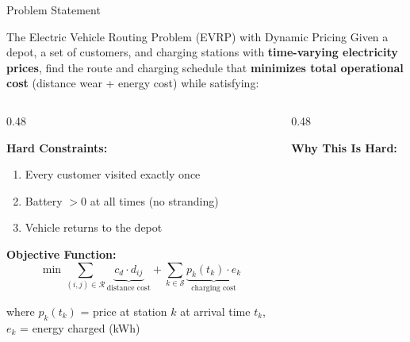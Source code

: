 \documentclass[aspectratio=169, 11pt]{beamer}
\begin{document}
\begin{frame}{Problem Statement}

\begin{block}{The Electric Vehicle Routing Problem (EVRP) with Dynamic Pricing}
Given a depot, a set of customers, and charging stations with \textbf{time-varying electricity prices}, find the route and charging schedule that \textbf{minimizes total operational cost} (distance wear + energy cost) while satisfying:
\end{block}

\vspace{0.4em}

\begin{columns}[T]
\begin{column}{0.48\textwidth}

\textbf{Hard Constraints:}
\begin{enumerate}
    \item Every customer visited exactly once
    \item Battery $> 0$ at all times (no stranding)
    \item Vehicle returns to the depot
\end{enumerate}

\vspace{0.5em}

\textbf{Objective Function:}
\[
\min \sum_{(i,j) \in \mathcal{R}} \underbrace{c_d \cdot d_{ij}}_{\text{distance cost}} + \sum_{k \in \mathcal{S}} \underbrace{p_k(t_k) \cdot e_k}_{\text{charging cost}}
\]

{\small where $p_k(t_k)$ = price at station $k$ at arrival time $t_k$, \\ $e_k$ = energy charged (kWh)}

\end{column}
\begin{column}{0.48\textwidth}

\textbf{Why This Is Hard:}

\end{column}
\end{columns}
\end{frame}
\end{document}
